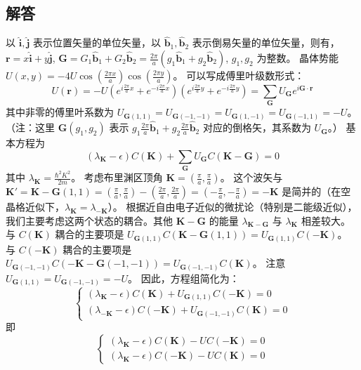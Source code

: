 \documentclass[12pt, a4paper]{article}
\newcommand{\vek}[1]{\mathbf{#1}}
\begin{document}
\subsection*{解答}
以 \(\hat{\mathbf{i}}, \hat{\mathbf{j}}\) 表示位置矢量的单位矢量，以 \(\hat{\mathbf{b}}_1, \hat{\mathbf{b}}_2\) 表示倒易矢量的单位矢量，则有，
\( \vek{r} = x\hat{\mathbf{i}} + y\hat{\mathbf{j}} \), \( \vek{G} = G_1\hat{\mathbf{b}}_1 + G_2\hat{\mathbf{b}}_2 = \frac{2\pi}{a}(g_1\hat{\mathbf{b}}_1 + g_2\hat{\mathbf{b}}_2) \), \( g_1, g_2 \) 为整数。
晶体势能 \( U(x,y) = -4U \cos\left(\frac{2\pi x}{a}\right) \cos\left(\frac{2\pi y}{a}\right) \)。
可以写成傅里叶级数形式：
\[
U(\vek{r}) = -U \left( e^{i\frac{2\pi}{a}x} + e^{-i\frac{2\pi}{a}x} \right) \left( e^{i\frac{2\pi}{a}y} + e^{-i\frac{2\pi}{a}y} \right) = \sum_{\vek{G}} U_{\vek{G}} e^{i\vek{G}\cdot \vek{r}}
\]
其中非零的傅里叶系数为 \( U_{\vek{G}(1,1)} = U_{\vek{G}(-1,-1)} = U_{\vek{G}(1,-1)} = U_{\vek{G}(-1,1)} = -U \)。 （注：这里 \(\vek{G}(g_1, g_2)\) 表示 \(g_1\frac{2\pi}{a}\hat{\mathbf{b}}_1 + g_2\frac{2\pi}{a}\hat{\mathbf{b}}_2\) 对应的倒格矢，其系数为 \(U_{\vek{G}}\)。）
基本方程为
\[
(\lambda_{\vek{K}} - \epsilon)C(\vek{K}) + \sum_{\vek{G}} U_{\vek{G}} C(\vek{K}-\vek{G}) = 0
\]
其中 \( \lambda_{\vek{K}} = \frac{\hbar^2 K^2}{2m} \)。
考虑布里渊区顶角 \( \vek{K} = (\frac{\pi}{a}, \frac{\pi}{a}) \)。 这个波矢与 \( \vek{K}' = \vek{K} - \vek{G}(1,1) = (\frac{\pi}{a}, \frac{\pi}{a}) - (\frac{2\pi}{a}, \frac{2\pi}{a}) = (-\frac{\pi}{a}, -\frac{\pi}{a}) = -\vek{K} \) 是简并的（在空晶格近似下，\( \lambda_{\vek{K}} = \lambda_{-\vek{K}} \)）。
根据近自由电子近似的微扰论（特别是二能级近似），我们主要考虑这两个状态的耦合。其他 \( \vek{K} - \vek{G} \) 的能量 \( \lambda_{\vek{K}-\vek{G}} \) 与 \( \lambda_{\vek{K}} \) 相差较大。
与 \( C(\vek{K}) \) 耦合的主要项是 \( U_{\vek{G}(1,1)} C(\vek{K}-\vek{G}(1,1)) = U_{\vek{G}(1,1)} C(-\vek{K}) \)。
与 \( C(-\vek{K}) \) 耦合的主要项是 \( U_{\vek{G}(-1,-1)} C(-\vek{K}-\vek{G}(-1,-1)) = U_{\vek{G}(-1,-1)} C(\vek{K}) \)。
注意 \( U_{\vek{G}(1,1)} = U_{\vek{G}(-1,-1)} = -U \)。
因此，方程组简化为：
\[
\begin{cases}
(\lambda_{\vek{K}} - \epsilon)C(\vek{K}) + U_{\vek{G}(1,1)} C(-\vek{K}) = 0 \\
(\lambda_{-\vek{K}} - \epsilon)C(-\vek{K}) + U_{\vek{G}(-1,-1)} C(\vek{K}) = 0
\end{cases}
\]
即
\[
\begin{cases}
(\lambda_{\vek{K}} - \epsilon)C(\vek{K}) - U C(-\vek{K}) = 0 \\
(\lambda_{\vek{K}} - \epsilon)C(-\vek{K}) - U C(\vek{K}) = 0
\end{cases}
\]
\end{document}
